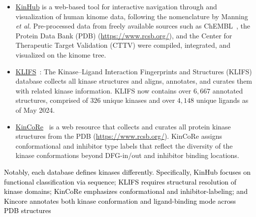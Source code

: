\documentclass[9pt,lessons]{livecoms}
\newcommand{\revision}[1]{\textcolor{black}{#1}}
\begin{document}
\begin{itemize}
\item {\href{http://www.kinhub.org/}{KinHub}} is a web-based tool for interactive navigation through and visualization of human kinome data, following the nomenclature by Manning \textit{et al.} Pre-processed data from freely available sources such as ChEMBL~\cite{zdrazil2023chembl}, the Protein Data Bank (PDB) (\url{https://www.rcsb.org/}), and the Center for Therapeutic Target Validation (CTTV) were compiled, integrated, and visualized on the kinome tree.~\cite{eid2017kinmap} 

\item {\href{https://klifs.net/}{KLIFS}}~\cite{Kanev2020}: The Kinase–Ligand Interaction Fingerprints and Structures (KLIFS) database collects all kinase structures and aligns, annotates, and curates them with related kinase information. KLIFS now contains over $6,667$ annotated structures, comprised of $326$ unique kinases and over $4,148$ unique ligands as of May 2024.

\item {\href{http://dunbrack.fccc.edu/kincore/home}{KinCoRe}}~\cite{Modi2021} is a web resource that collects and curates all protein kinase structures from the PDB (\url{https://www.rcsb.org/}). KinCoRe assigns conformational and inhibitor type labels that reflect the diversity of the kinase conformations beyond DFG-in/out and inhibitor binding locations. %

\end{itemize}
\revision{Notably, each database defines kinases differently. Specifically, KinHub focuses on functional classification via sequence; KLIFS requires structural resolution of kinase domains; KinCoRe emphasizes conformational and inhibitor-labeling; and Kincore annotates both kinase conformation and ligand-binding mode across PDB structures}
\end{document}
